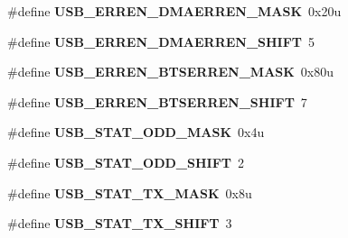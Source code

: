 \begin{DoxyCompactItemize}
\item 
\#define {\bfseries U\+S\+B\+\_\+\+E\+R\+R\+E\+N\+\_\+\+D\+M\+A\+E\+R\+R\+E\+N\+\_\+\+M\+A\+SK}~0x20u\hypertarget{group__USB__Register__Masks_gae1e237556956a0eb5e669aadded213b8}{}\label{group__USB__Register__Masks_gae1e237556956a0eb5e669aadded213b8}

\item 
\#define {\bfseries U\+S\+B\+\_\+\+E\+R\+R\+E\+N\+\_\+\+D\+M\+A\+E\+R\+R\+E\+N\+\_\+\+S\+H\+I\+FT}~5\hypertarget{group__USB__Register__Masks_ga8b75afb2fa004a75b39023e38db4e784}{}\label{group__USB__Register__Masks_ga8b75afb2fa004a75b39023e38db4e784}

\item 
\#define {\bfseries U\+S\+B\+\_\+\+E\+R\+R\+E\+N\+\_\+\+B\+T\+S\+E\+R\+R\+E\+N\+\_\+\+M\+A\+SK}~0x80u\hypertarget{group__USB__Register__Masks_ga806a809f05df66a7669733c599646f7f}{}\label{group__USB__Register__Masks_ga806a809f05df66a7669733c599646f7f}

\item 
\#define {\bfseries U\+S\+B\+\_\+\+E\+R\+R\+E\+N\+\_\+\+B\+T\+S\+E\+R\+R\+E\+N\+\_\+\+S\+H\+I\+FT}~7\hypertarget{group__USB__Register__Masks_ga5e760a100c4f43ecfd71952a5f393d77}{}\label{group__USB__Register__Masks_ga5e760a100c4f43ecfd71952a5f393d77}

\item 
\#define {\bfseries U\+S\+B\+\_\+\+S\+T\+A\+T\+\_\+\+O\+D\+D\+\_\+\+M\+A\+SK}~0x4u\hypertarget{group__USB__Register__Masks_ga49caa3c5b36fc89eadadd60cdf331643}{}\label{group__USB__Register__Masks_ga49caa3c5b36fc89eadadd60cdf331643}

\item 
\#define {\bfseries U\+S\+B\+\_\+\+S\+T\+A\+T\+\_\+\+O\+D\+D\+\_\+\+S\+H\+I\+FT}~2\hypertarget{group__USB__Register__Masks_ga15f3e2fa671ea1a59e0b24a9697faf8a}{}\label{group__USB__Register__Masks_ga15f3e2fa671ea1a59e0b24a9697faf8a}

\item 
\#define {\bfseries U\+S\+B\+\_\+\+S\+T\+A\+T\+\_\+\+T\+X\+\_\+\+M\+A\+SK}~0x8u\hypertarget{group__USB__Register__Masks_gab953f904ef3a2b838a922ebdf69cf140}{}\label{group__USB__Register__Masks_gab953f904ef3a2b838a922ebdf69cf140}

\item 
\#define {\bfseries U\+S\+B\+\_\+\+S\+T\+A\+T\+\_\+\+T\+X\+\_\+\+S\+H\+I\+FT}~3\hypertarget{group__USB__Register__Masks_ga5173e8423017932d90919ddb18f918bd}{}\label{group__USB__Register__Masks_ga5173e8423017932d90919ddb18f918bd}


\end{DoxyCompactItemize}
